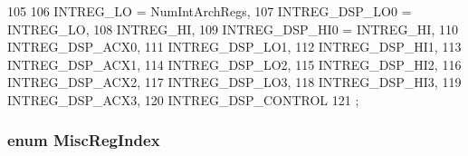 \begin{DoxyCode}
105                     {
106    INTREG_LO = NumIntArchRegs,
107    INTREG_DSP_LO0 = INTREG_LO,
108    INTREG_HI,
109    INTREG_DSP_HI0 = INTREG_HI,
110    INTREG_DSP_ACX0,
111    INTREG_DSP_LO1,
112    INTREG_DSP_HI1,
113    INTREG_DSP_ACX1,
114    INTREG_DSP_LO2,
115    INTREG_DSP_HI2,
116    INTREG_DSP_ACX2,
117    INTREG_DSP_LO3,
118    INTREG_DSP_HI3,
119    INTREG_DSP_ACX3,
120    INTREG_DSP_CONTROL
121 };
\end{DoxyCode}
\hypertarget{namespaceMipsISA_a1e522017e015d4c7efd6b2360143aa67}{
\subsubsection[{MiscRegIndex}]{\setlength{\rightskip}{0pt plus 5cm}enum {\bf MiscRegIndex}}}
\label{namespaceMipsISA_a1e522017e015d4c7efd6b2360143aa67}
